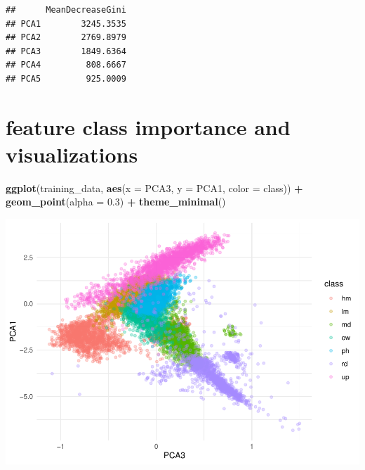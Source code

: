 \documentclass[
]{article}
\newenvironment{Shaded}{\begin{snugshade}}{\end{snugshade}}
\newcommand{\AttributeTok}[1]{\textcolor[rgb]{0.13,0.29,0.53}{#1}}
\newcommand{\CommentTok}[1]{\textcolor[rgb]{0.56,0.35,0.01}{\textit{#1}}}
\newcommand{\ConstantTok}[1]{\textcolor[rgb]{0.56,0.35,0.01}{#1}}
\newcommand{\FloatTok}[1]{\textcolor[rgb]{0.00,0.00,0.81}{#1}}
\newcommand{\FunctionTok}[1]{\textcolor[rgb]{0.13,0.29,0.53}{\textbf{#1}}}
\newcommand{\NormalTok}[1]{#1}
\newcommand{\SpecialCharTok}[1]{\textcolor[rgb]{0.81,0.36,0.00}{\textbf{#1}}}
\newcommand{\StringTok}[1]{\textcolor[rgb]{0.31,0.60,0.02}{#1}}
\begin{document}
\begin{Shaded}
\end{Shaded}

\begin{verbatim}
##      MeanDecreaseGini
## PCA1        3245.3535
## PCA2        2769.8979
## PCA3        1849.6364
## PCA4         808.6667
## PCA5         925.0009
\end{verbatim}

\section{feature class importance and
visualizations}\label{feature-class-importance-and-visualizations-3}

\begin{Shaded}
\begin{Highlighting}[]
\FunctionTok{ggplot}\NormalTok{(training\_data, }\FunctionTok{aes}\NormalTok{(}\AttributeTok{x =}\NormalTok{ PCA3, }\AttributeTok{y =}\NormalTok{ PCA1, }\AttributeTok{color =}\NormalTok{ class)) }\SpecialCharTok{+}
  \FunctionTok{geom\_point}\NormalTok{(}\AttributeTok{alpha =} \FloatTok{0.3}\NormalTok{) }\SpecialCharTok{+}
  \FunctionTok{theme\_minimal}\NormalTok{()}
\end{Highlighting}
\end{Shaded}

\includegraphics{veg_model_new_class_files/figure-latex/unnamed-chunk-17-1.pdf}
\end{document}
